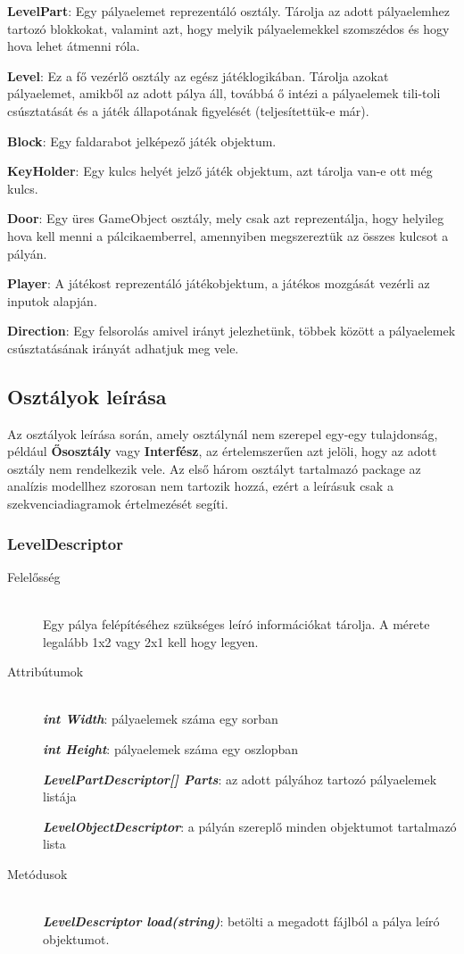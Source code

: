 \textbf{LevelPart}: Egy pályaelemet reprezentáló osztály. Tárolja az adott pályaelemhez tartozó blokkokat, valamint azt, hogy melyik pályaelemekkel szomszédos és hogy hova lehet átmenni róla.

\textbf{Level}: Ez a fő vezérlő osztály az egész játéklogikában. Tárolja azokat pályaelemet, amikből az adott pálya áll, továbbá ő intézi a pályaelemek tili-toli csúsztatását és a játék állapotának figyelését (teljesítettük-e már).

\textbf{Block}: Egy faldarabot jelképező játék objektum. 

\textbf{KeyHolder}: Egy kulcs helyét jelző játék objektum, azt tárolja van-e ott még kulcs.

\textbf{Door}: Egy üres GameObject osztály, mely csak azt reprezentálja, hogy helyileg hova kell menni a pálcikaemberrel, amennyiben megszereztük az összes kulcsot a pályán.

\textbf{Player}: A játékost reprezentáló játékobjektum, a játékos mozgását vezérli az inputok alapján.

\textbf{Direction}: Egy felsorolás amivel irányt jelezhetünk, többek között a pályaelemek csúsztatásának irányát adhatjuk meg vele.

\subsection{Osztályok leírása}

Az osztályok leírása során, amely osztálynál nem szerepel egy-egy tulajdonság, például \textbf{Ősosztály} vagy \textbf{Interfész}, az értelemszerűen azt jelöli, hogy az adott osztály nem rendelkezik vele. Az első három osztályt tartalmazó package az analízis modellhez szorosan nem tartozik hozzá, ezért a leírásuk csak a szekvenciadiagramok értelmezését segíti.

\subsubsection{LevelDescriptor}
	\begin{description}
		\item[Felelősség] \hfill \\
		Egy pálya felépítéséhez szükséges leíró információkat tárolja. A mérete legalább 1x2 vagy 2x1 kell hogy legyen.
		
		\item[Attribútumok]\hfill \\
		\textbf{\emph{int Width}}: pályaelemek száma egy sorban
		
		\textbf{\emph{int Height}}: pályaelemek száma egy oszlopban
		
		\textbf{\emph{LevelPartDescriptor[] Parts}}: az adott pályához tartozó pályaelemek listája
		
		\textbf{\emph{LevelObjectDescriptor}}: a pályán szereplő minden objektumot tartalmazó lista
				
		\item[Metódusok]\hfill \\
		\textbf{\emph{LevelDescriptor load(string)}}: betölti a megadott fájlból a pálya leíró objektumot.
						
	\end{description}

